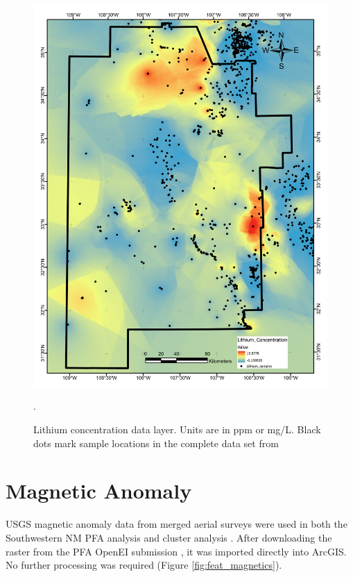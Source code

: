 \begin{figure}[H]
\centering
\includegraphics[width=0.75\linewidth]{templates/images/Figure-Lithium.pdf}
\caption[Lithium concentration data layer]{Lithium concentration data layer. Units are in ppm or mg/L. Black dots mark sample locations in the complete data set from \protect\citet{bielicki_hydrogeolgic_2015}}.
\label{fig:feat_lithium}
\end{figure}
\pagebreak

\section{Magnetic Anomaly}\label{app:dl_magnetic_anomaly}
USGS magnetic anomaly data from merged aerial surveys \citep{bankey_digital_2002} were used in both the Southwestern NM PFA analysis \citep{bielicki_hydrogeolgic_2015} and cluster analysis \citep{pepin_new_2018}. After downloading the raster from the PFA OpenEI submission \citep{kelley_geothermal_2015}, it was imported directly into ArcGIS. No further processing was required (Figure \ref{fig:feat_magnetics}).

